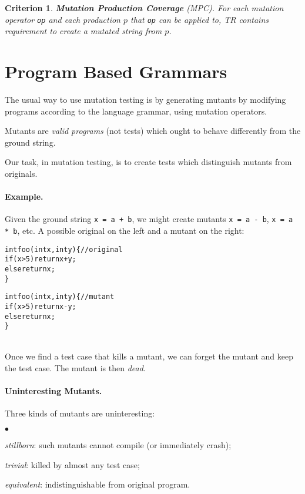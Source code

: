 \documentclass[11pt]{article}
\newtheorem{crit}{Criterion}
\newcommand{\squishlist}{
 \begin{list}{$\bullet$}
  { \setlength{\itemsep}{0pt}
     \setlength{\parsep}{3pt}
     \setlength{\topsep}{3pt}
     \setlength{\partopsep}{0pt}
     \setlength{\leftmargin}{1.5em}
     \setlength{\labelwidth}{1em}
     \setlength{\labelsep}{0.5em} } }
\newcommand{\squishend}{
  \end{list}  }
\begin{document}
\begin{crit}
{\bf Mutation Production Coverage} (MPC). For each mutation operator
{\tt op} and each production $p$ that {\tt op} can be applied to, TR
contains requirement to create a mutated string from $p$.
\end{crit}

\section*{Program Based Grammars} 

The usual way to use mutation testing is by generating mutants 
by modifying programs according to the language grammar,
using mutation operators.

Mutants are \emph{valid programs} (not tests) which ought to behave
differently from the ground string.

Our task, in mutation testing, is to create tests which distinguish
mutants from originals.

\paragraph{Example.} Given the ground string {\tt x = a + b},
we might create mutants {\tt x = a - b}, {\tt x = a * b}, etc.
A possible original on the
left and a mutant on the right:

\begin{minipage}{.5\textwidth} 
\begin{alltt}
int foo(int x, int y) \{ // original
  if (x > 5) return x + y;
  else return x;
\}
\end{alltt}
\end{minipage}\begin{minipage}{.5\textwidth}
\begin{alltt}
int foo(int x, int y) \{ // mutant
  if (x > 5) return x - y;
  else return x;
\}
\end{alltt}
\end{minipage}
~\\[3em]

Once we find a test case that kills a mutant, we can forget the
mutant and keep the test case. The mutant is then \emph{dead}.

\paragraph{Uninteresting Mutants.} Three kinds of mutants are uninteresting:
\squishlist
\item \emph{stillborn}: such mutants cannot compile (or immediately crash);
\item \emph{trivial}: killed by almost any test case;
\item \emph{equivalent}: indistinguishable from original program.
\squishend
\end{document}
